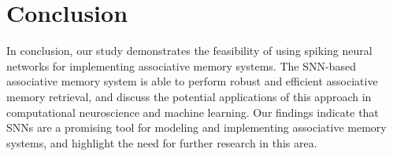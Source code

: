 \chapter{Conclusion}%

In conclusion, our study demonstrates the feasibility of using spiking neural
networks for implementing associative memory systems. The SNN-based associative
memory system is able to perform robust and efficient associative memory
retrieval, and discuss the potential applications of this approach in
computational neuroscience and machine learning. Our findings indicate that
SNNs are a promising tool for modeling and implementing associative memory
systems, and highlight the need for further research in this area.\par
